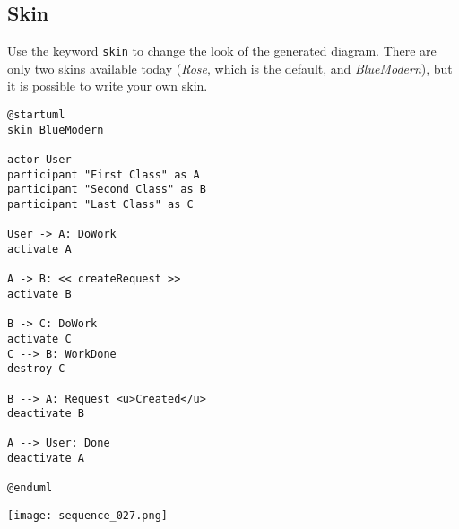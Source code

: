 \newpage \subsection{Skin}

Use the keyword \texttt{skin} to change the look of the generated diagram.
There are only two skins available today (\textit{Rose}, which is the default, and \textit{BlueModern}),
but it is possible to write your own skin.

\begin{lstlisting}
@startuml
skin BlueModern

actor User
participant "First Class" as A
participant "Second Class" as B
participant "Last Class" as C

User -> A: DoWork
activate A

A -> B: << createRequest >>
activate B

B -> C: DoWork
activate C
C --> B: WorkDone
destroy C

B --> A: Request <u>Created</u>
deactivate B

A --> User: Done
deactivate A

@enduml
\end{lstlisting}
\begin{center}
\texttt{[image: sequence\_027.png]}
\end{center}
		


		

		
		